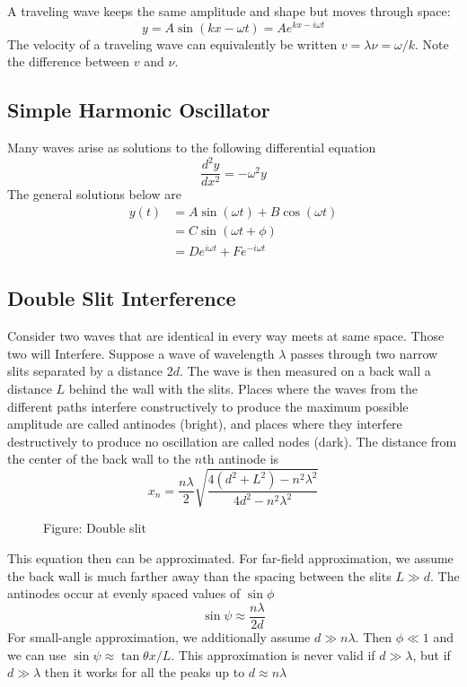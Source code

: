 \documentclass[../../main.tex]{subfiles}
\begin{document}
A traveling wave keeps the same amplitude and shape but moves through space:
\begin{equation*}
    y=A\sin (kx-\omega t)=Ae^{kx-i\omega t}
\end{equation*}
The velocity of a traveling wave can equivalently be written $v =\lambda \nu=\omega /k$. Note the difference between $v$ and $\nu$.

\subsection{Simple Harmonic Oscillator}
Many waves arise as solutions to the following differential equation
\begin{equation*}
    \frac{d^2y}{dx^2}=-\omega^2y
\end{equation*}
The  general solutions below are 
\begin{align*}
    y(t)&=A \sin(\omega t) + B \cos(\omega t)\\
    &=C \sin(\omega t + \phi)\\
    &=De^{i\omega t} + Fe^{- i\omega t}
\end{align*}

\subsection{Double Slit Interference }
Consider two waves that are identical in every way meets at same space. Those two will Interfere. Suppose a wave of wavelength $\lambda$ passes through two narrow slits separated by a distance $2d$. The wave is then measured on a back wall a distance $L$ behind the wall with the slits. Places where the waves from the different paths interfere constructively to produce the maximum possible amplitude are called antinodes (bright), and places where they interfere destructively to produce no oscillation are called nodes (dark). The distance from the center of the back wall to the $n$th antinode is
\begin{equation*}
    x_n=\frac{n\lambda}{2}\sqrt{\frac{4 (d^2 + L^2) - n^2\lambda^2}{4d^2 - n^2\lambda^2}}
\end{equation*}
 \begin{figure}
    \centering
    \caption*{Figure: Double slit}
\end{figure}

This equation then can be approximated. For far-field approximation, we assume the back wall is much farther away than the spacing between the slits $L\gg d$. The antinodes occur at evenly spaced values of $\sin \phi$
\begin{equation*}
    \sin \psi \approx \frac{n\lambda}{2d}
\end{equation*}
For small-angle approximation, we additionally assume $d \gg n\lambda$. Then $\phi \ll 1$ and we can use $\sin \psi\approx \tan\theta x/L$. This approximation is never valid if $d \gg \lambda$, but if $d \gg \lambda$ then it works for all the peaks up to $d \approx n\lambda$
\end{document}
